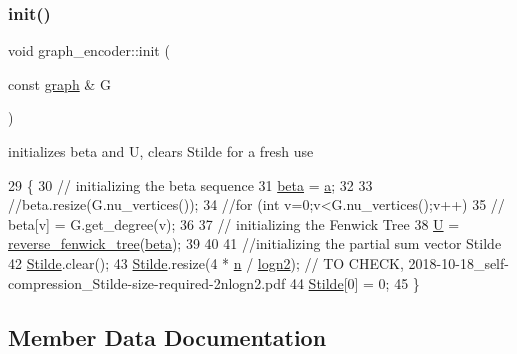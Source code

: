 \mbox{\label{classgraph__encoder_a6cfb6fca4bc50d4e5d267060a91f43c3}} 
\subsubsection{\texorpdfstring{init()}{init()}}
{\footnotesize\ttfamily void graph\+\_\+encoder\+::init (\begin{DoxyParamCaption}\item[{const \hyperlink{classgraph}{graph} \&}]{G }\end{DoxyParamCaption})}



initializes beta and U, clears Stilde for a fresh use 


\begin{DoxyCode}
29 \{
30   \textcolor{comment}{// initializing the beta sequence}
31   \hyperlink{classgraph__encoder_a40880adecfd63fb86e94b4b0fc3f6bc2}{beta} = \hyperlink{classgraph__encoder_a56eb5cf480ae5c2fca9f3a45f2ffd4f1}{a}; 
32 
33   \textcolor{comment}{//beta.resize(G.nu\_vertices());}
34   \textcolor{comment}{//for (int v=0;v<G.nu\_vertices();v++)}
35   \textcolor{comment}{//  beta[v] = G.get\_degree(v);  }
36 
37   \textcolor{comment}{// initializing the Fenwick Tree}
38   \hyperlink{classgraph__encoder_a3314c40920f2ee132958a6b0ce7e7995}{U} = \hyperlink{classreverse__fenwick__tree}{reverse\_fenwick\_tree}(\hyperlink{classgraph__encoder_a40880adecfd63fb86e94b4b0fc3f6bc2}{beta});
39 
40 
41   \textcolor{comment}{//initializing the partial sum vector Stilde}
42   \hyperlink{classgraph__encoder_a342688a3fdee511b7fae3f155cfb10cf}{Stilde}.clear();
43   \hyperlink{classgraph__encoder_a342688a3fdee511b7fae3f155cfb10cf}{Stilde}.resize(4 * \hyperlink{classgraph__encoder_a7fedc9ace19e34abb32f1851c8597591}{n} / \hyperlink{classgraph__encoder_a27fde3a95a280304877b1e37fc4d8553}{logn2}); \textcolor{comment}{// TO CHECK,
       2018-10-18\_self-compression\_Stilde-size-required-2nlogn2.pdf}
44   \hyperlink{classgraph__encoder_a342688a3fdee511b7fae3f155cfb10cf}{Stilde}[0] = 0;
45 \}
\end{DoxyCode}


\subsection{Member Data Documentation}
\mbox{\label{classgraph__encoder_a56eb5cf480ae5c2fca9f3a45f2ffd4f1}} 
